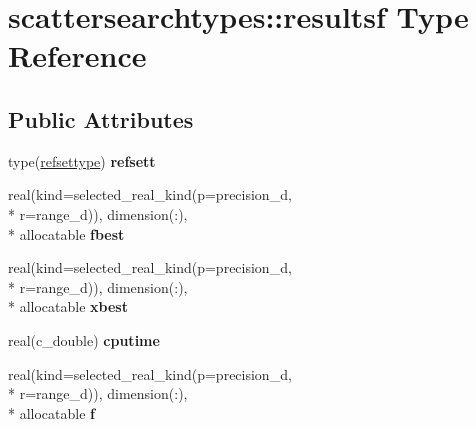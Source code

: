 \hypertarget{structscattersearchtypes_1_1resultsf}{\section{scattersearchtypes\-:\-:resultsf Type Reference}
\label{structscattersearchtypes_1_1resultsf}
}
\subsection*{Public Attributes}
\begin{DoxyCompactItemize}
\item 
\hypertarget{structscattersearchtypes_1_1resultsf_a1930fccb9994fd93b612b29967ec0474}{type(\hyperlink{structscattersearchtypes_1_1refsettype}{refsettype}) {\bfseries refsett}}\label{structscattersearchtypes_1_1resultsf_a1930fccb9994fd93b612b29967ec0474}

\item 
\hypertarget{structscattersearchtypes_1_1resultsf_a1cc0a5ad5a68bc5e8ed22123207184ff}{real(kind=selected\-\_\-real\-\_\-kind(p=precision\-\_\-d, \\*
r=range\-\_\-d)), dimension(\-:), \\*
allocatable {\bfseries fbest}}\label{structscattersearchtypes_1_1resultsf_a1cc0a5ad5a68bc5e8ed22123207184ff}

\item 
\hypertarget{structscattersearchtypes_1_1resultsf_aa2e334634f9815af5188382841156f9f}{real(kind=selected\-\_\-real\-\_\-kind(p=precision\-\_\-d, \\*
r=range\-\_\-d)), dimension(\-:), \\*
allocatable {\bfseries xbest}}\label{structscattersearchtypes_1_1resultsf_aa2e334634f9815af5188382841156f9f}

\item 
\hypertarget{structscattersearchtypes_1_1resultsf_a10f826c895e539cd392a6e373fc4f00c}{real(c\-\_\-double) {\bfseries cputime}}\label{structscattersearchtypes_1_1resultsf_a10f826c895e539cd392a6e373fc4f00c}

\item 
\hypertarget{structscattersearchtypes_1_1resultsf_ad62f683dd8fe510ac3de629c6f1f0b0e}{real(kind=selected\-\_\-real\-\_\-kind(p=precision\-\_\-d, \\*
r=range\-\_\-d)), dimension(\-:), \\*
allocatable {\bfseries f}}\label{structscattersearchtypes_1_1resultsf_ad62f683dd8fe510ac3de629c6f1f0b0e}


\end{DoxyCompactItemize}
